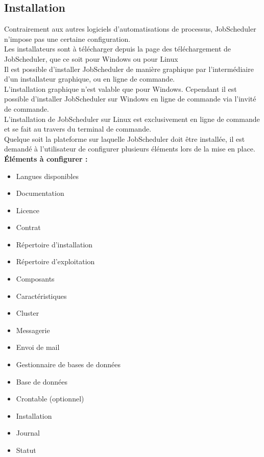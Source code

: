 \documentclass[12pt]{article}
\begin{document}
\subsection{Installation}
Contrairement aux autres logiciels d'automatisations de processus, JobScheduler n'impose pas une certaine configuration.
\\
Les installateurs sont à télécharger depuis la page des téléchargement de JobScheduler, que ce soit pour Windows ou pour Linux
\\
Il est possible d'installer JobScheduler de manière graphique par l'intermédiaire d'un installateur graphique, ou en ligne de commande.
\\
L'installation graphique n'est valable que pour Windows. Cependant il est possible d'installer JobScheduler sur Windows en ligne de commande via l'invité de commande.
\\
L'installation de JobScheduler sur Linux est exclusivement en ligne de commande et se fait au travers du terminal de commande.
\\
Quelque soit la plateforme sur laquelle JobScheduler doit être installée, il est demandé à l'utilisateur de configurer plusieurs éléments lors de la mise en place.
\vspace{0.2cm}
\\
\textbf{Éléments à configurer :}
\\
\begin{itemize}
    \item Langues disponibles 
    \item Documentation
    \item Licence
    \item Contrat
    \item Répertoire d’installation
    \item Répertoire d’exploitation
    \item Composants
    \item Caractéristiques
    \item Cluster
    \item Messagerie
    \item Envoi de mail
    \item Gestionnaire de bases de données
    \item Base de données
    \item Crontable (optionnel)
    \item Installation
    \item Journal 
    \item Statut
\end{itemize}
\end{document}

